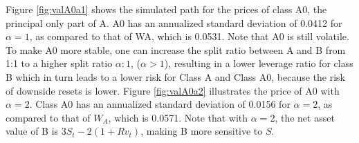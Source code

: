\documentclass[draft, noinfoline]{ectaart}
\numberwithin{equation}{section}
\theoremstyle{plain}
\begin{document}
\begin{appendices}
Figure \ref{fig:valA0a1} shows the simulated path for the prices of class A0, the principal only part of A. A0 has an annualized standard deviation of 0.0412 for $\alpha=1$, as compared to that of WA, which is 0.0531. Note that A0 is still volatile. To make A0 more stable, one can increase the split ratio between A and B from 1:1 to a higher split ratio $\alpha:1$, ($\alpha >1$), resulting in a lower leverage ratio for class B which in turn leads to a lower risk for Class A and Class A0, because the risk of downside resets is lower. Figure \ref{fig:valA0a2} illustrates the price of A0 with $\alpha=2$. Class A0 has an annualized standard deviation of 0.0156 for $\alpha=2$, as compared to that of $W_A$, which is 0.0571. Note that with $\alpha = 2$, the net asset value of B is $3S_t-2(1+R v_t)$, making B more sensitive to $S$.









\end{appendices}
\end{document}

